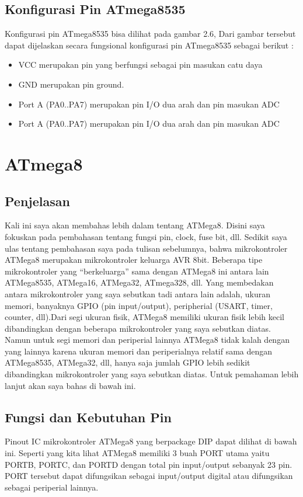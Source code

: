 		\subsection{Konfigurasi Pin ATmega8535}
		Konfigurasi pin ATmega8535 bisa dilihat pada gambar 2.6, Dari gambar tersebut dapat dijelaskan secara fungsional konfigurasi pin ATmega8535 sebagai berikut :
		\begin{itemize}
			\item VCC merupakan pin yang berfungsi sebagai pin masukan catu daya
			\item GND merupakan pin ground.
			\item Port A (PA0..PA7) merupakan pin I/O dua arah dan pin masukan ADC
			\item Port A (PA0..PA7) merupakan pin I/O dua arah dan pin masukan ADC
		\end{itemize}

\section{ATmega8}

	\subsection{Penjelasan}
		Kali ini saya akan membahas lebih dalam tentang ATMega8. Disini saya fokuskan pada pembahasan tentang fungsi pin, clock, fuse bit, dll.
		Sedikit saya ulas tentang pembahasan saya pada tulisan sebelumnya, bahwa mikrokontroler ATMega8 merupakan mikrokontroler keluarga AVR 8bit. Beberapa tipe mikrokontroler yang “berkeluarga” sama dengan ATMega8 ini antara lain ATMega8535, ATMega16, ATMega32, ATmega328, dll. Yang membedakan antara mikrokontroler yang saya sebutkan tadi antara lain adalah, ukuran memori, banyaknya GPIO (pin input/output), peripherial (USART, timer, counter, dll).Dari segi ukuran fisik, ATMega8 memiliki ukuran fisik lebih kecil dibandingkan dengan beberapa mikrokontroler yang saya sebutkan diatas. Namun untuk segi memori dan periperial lainnya ATMega8 tidak kalah dengan yang lainnya karena ukuran memori dan periperialnya relatif sama dengan ATMega8535, ATMega32, dll, hanya saja jumlah GPIO lebih sedikit dibandingkan mikrokontroler yang saya sebutkan diatas. Untuk pemahaman lebih lanjut akan saya bahas di bawah ini.
	
	\subsection{Fungsi dan Kebutuhan Pin}
		Pinout IC mikrokontroler ATMega8 yang berpackage DIP dapat dilihat di bawah ini.
		Seperti yang kita lihat ATMega8 memiliki 3 buah PORT utama yaitu PORTB, PORTC, dan PORTD dengan total pin input/output sebanyak 23 pin. PORT tersebut dapat difungsikan sebagai input/output digital atau difungsikan sebagai periperial lainnya.
		
